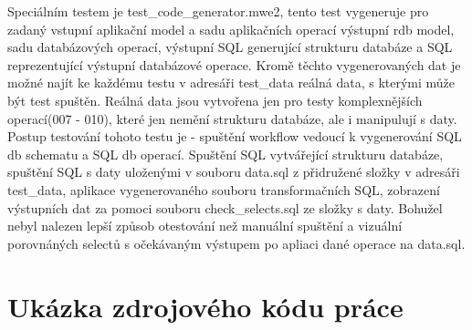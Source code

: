 \documentclass[11pt,twoside,a4paper]{book}
\begin{document}
Speciálním testem je test\_code\_generator.mwe2, tento test vygeneruje pro
zadaný vstupní aplikační model a sadu aplikačních operací výstupní rdb model, sadu
databázových operací, výstupní SQL generující strukturu databáze a SQL
reprezentující výstupní databázové operace. Kromě těchto vygenerovaných dat je
možné najít ke každému testu v adresáři test\_data reálná data, s kterými může
být test spuštěn. Reálná data jsou vytvořena jen pro testy komplexnějších
operací(007 - 010), které jen nemění strukturu databáze, ale i manipulují s
daty. Postup testování tohoto testu je - spuštění workflow vedoucí k
vygenerování SQL db schematu a SQL db operací. Spuštění SQL vytvářející
strukturu databáze, spuštění SQL s daty uloženými v souboru data.sql z
přidružené složky v adresáři test\_data, aplikace vygenerovaného souboru
transformačních SQL, zobrazení výstupních dat za pomoci souboru
check\_selects.sql ze složky s daty. Bohužel nebyl nalezen lepší způsob
otestování než manuální spuštění a vizuální porovnáných selectů s očekávaným
výstupem po apliaci dané operace na data.sql.

\chapter{Ukázka zdrojového kódu práce}
\end{document}
